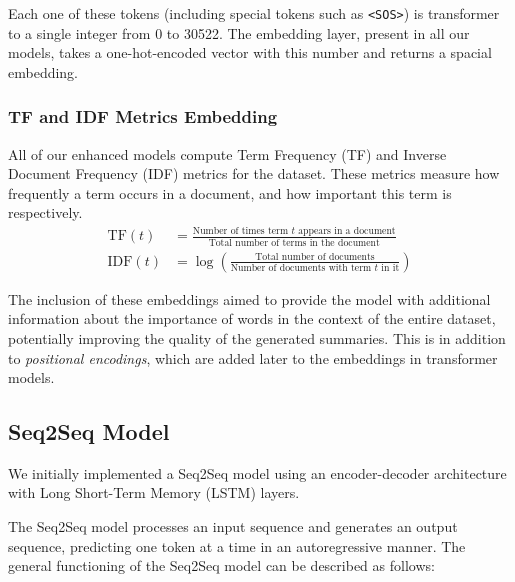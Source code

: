 Each one of these tokens (including special tokens such as \texttt{<SOS>}) is transformer to a single integer from 0 to \num{30522}.
The embedding layer, present in all our models, takes a one-hot-encoded vector with this number and returns a spacial embedding.

\subsubsection{TF and IDF Metrics Embedding}

All of our enhanced models compute Term Frequency (TF) and Inverse Document Frequency (IDF) metrics for the dataset\cite{nallapati2016abstractive}.
These metrics measure how frequently a term occurs in a document, and how important this term is respectively.
\begin{align}
	\text{TF}(t) &= \frac{\text{Number of times term $t$ appears in a document}}{\text{Total number of terms in the document}} \\[1ex]
	\text{IDF}(t) &= \log \left( \frac{\text{Total number of documents}}{\text{Number of documents with term $t$ in it}} \right)
\end{align}

The inclusion of these embeddings aimed to provide the model with additional information about the importance of words in the context of the entire dataset, potentially improving the quality of the generated summaries.
This is in addition to \emph{positional encodings}, which are added later to the embeddings in transformer models.

\subsection{Seq2Seq Model}

We initially implemented a Seq2Seq model\cite{sutskever2014sequence} using an encoder-decoder architecture with Long Short-Term Memory (LSTM) layers\cite{lstm}.

The Seq2Seq model processes an input sequence and generates an output sequence, predicting one token at a time in an autoregressive manner. The general functioning of the Seq2Seq model can be described as follows:

